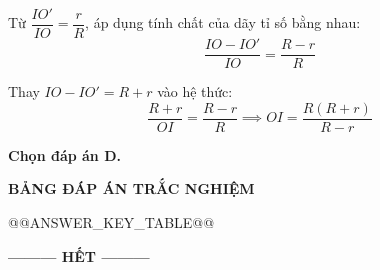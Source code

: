 \documentclass[11pt,a4paper]{article}
\begin{document}
Từ $\dfrac{IO'}{IO} = \dfrac{r}{R}$, áp dụng tính chất của dãy tỉ số bằng nhau:
\[\dfrac{IO - IO'}{IO} = \dfrac{R - r}{R}\]

Thay $IO - IO' = R + r$ vào hệ thức:
\[\dfrac{R + r}{OI} = \dfrac{R - r}{R} \implies OI = \dfrac{R(R + r)}{R - r}\]

\textbf{Chọn đáp án D.}

\vspace{0.4cm}
\begin{center}
\textbf{BẢNG ĐÁP ÁN TRẮC NGHIỆM}
\end{center}

@@ANSWER_KEY_TABLE@@

\vspace{0.4cm}
\begin{center}
\textbf{--------- HẾT ---------}
\end{center}
\end{document}
